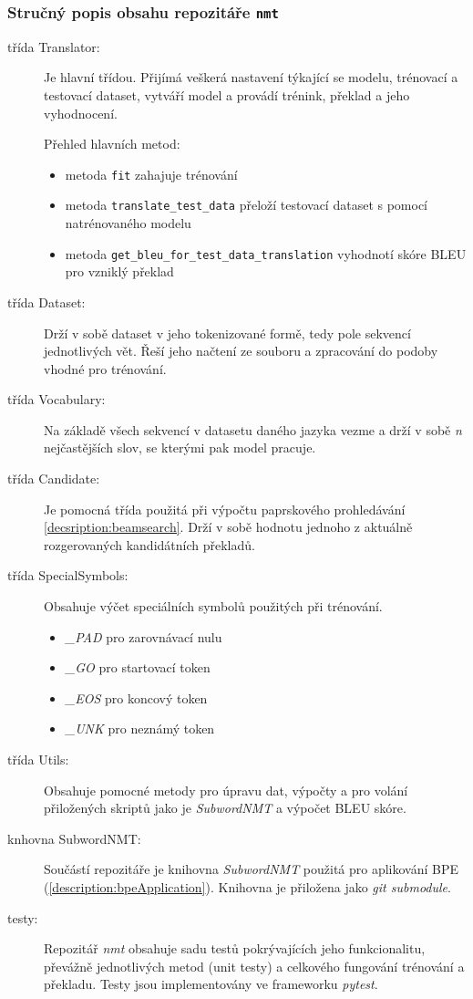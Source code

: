 

\subsubsection{Stručný popis obsahu repozitáře \texttt{nmt}}
\begin{description}
  \item[třída Translator:] Je hlavní třídou. Přijímá veškerá nastavení týkající se modelu, trénovací a testovací dataset, vytváří model a provádí trénink, překlad a jeho vyhodnocení.

      Přehled hlavních metod:
      \begin{itemize}
                  \item metoda \texttt{fit} zahajuje trénování
                  \item metoda \texttt{translate\_test\_data} přeloží testovací dataset s pomocí natrénovaného modelu
                  \item metoda \texttt{get\_bleu\_for\_test\_data\_translation} vyhodnotí skóre BLEU pro vzniklý překlad
      \end{itemize}
  \item[třída Dataset:] Drží v sobě dataset v jeho tokenizované formě, tedy pole sekvencí jednotlivých vět. Řeší jeho načtení ze souboru a zpracování do podoby vhodné pro trénování.
  \item[třída Vocabulary:] Na základě všech sekvencí v datasetu daného jazyka vezme a drží v sobě \emph{n} nejčastějších slov, se kterými pak model pracuje.
  \item[třída Candidate:] Je pomocná třída použitá při výpočtu paprskového prohledávání \ref{decsription:beamsearch}. Drží v sobě hodnotu jednoho z aktuálně rozgerovaných kandidátních překladů.
  \item[třída SpecialSymbols:] Obsahuje výčet speciálních symbolů použitých při trénování. \begin{itemize}
                  \item \emph{\_PAD} pro zarovnávací nulu
                  \item \emph{\_GO} pro startovací token
                  \item \emph{\_EOS} pro koncový token
                  \item \emph{\_UNK} pro neznámý token
                \end{itemize}
  \item[třída Utils:] Obsahuje pomocné metody pro úpravu dat, výpočty a pro volání přiložených skriptů jako je \emph{SubwordNMT} a výpočet BLEU skóre.
  \item[knhovna SubwordNMT:] Součástí repozitáře je knihovna \emph{SubwordNMT} použitá pro aplikování BPE (\ref{description:bpeApplication}). Knihovna je přiložena jako \emph{git submodule}.
  \item[testy:] Repozitář \emph{nmt} obsahuje sadu testů pokrývajících jeho funkcionalitu, převážně jednotlivých metod (unit testy) a celkového fungování trénování a překladu. Testy jsou implementovány ve frameworku \emph{pytest}.
\end{description}
